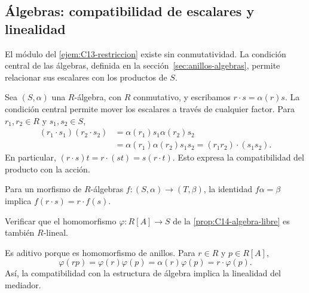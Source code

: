 \subsection{Álgebras: compatibilidad de escalares y linealidad}\label{tema:13-3-1a}\label{tema:13-3-1c}\label{tema:13-3-1e}\label{tema:14-3-2b}
El módulo del \cref{ejem:C13-restriccion} existe sin conmutatividad. La condición central de las álgebras, definida en la sección~\ref{sec:anillos-algebras}, permite relacionar sus escalares con los productos de $S$.

Sea $(S,\alpha)$ una $R$-álgebra, con $R$ conmutativo, y escribamos $r\cdot s=\alpha(r)s$. La condición central permite mover los escalares a través de cualquier factor. Para $r_1,r_2\in R$ y $s_1,s_2\in S$,
\[
\begin{aligned}
(r_1\cdot s_1)(r_2\cdot s_2)
&=\alpha(r_1)s_1\alpha(r_2)s_2\\
&=\alpha(r_1)\alpha(r_2)s_1s_2
=(r_1r_2)\cdot(s_1s_2).
\end{aligned}
\]
En particular, $(r\cdot s)t=r\cdot(st)=s(r\cdot t)$. Esto expresa la compatibilidad del producto con la acción.

Para un morfismo de $R$-álgebras $f:(S,\alpha)\to(T,\beta)$, la identidad $f\alpha=\beta$ implica $f(r\cdot s)=r\cdot f(s)$.

\begin{ejer}\label{ejer:C14-linealidad}
Verificar que el homomorfismo $\varphi:R[A]\to S$ de la \cref{prop:C14-algebra-libre} es también $R$-lineal.
\end{ejer}
\begin{sol}
Es aditivo porque es homomorfismo de anillos. Para $r\in R$ y $p\in R[A]$,
\[
\varphi(rp)=\varphi(r)\varphi(p)=\alpha(r)\varphi(p)=r\cdot\varphi(p).
\]
Así, la compatibilidad con la estructura de álgebra implica la linealidad del mediador.
\end{sol}
